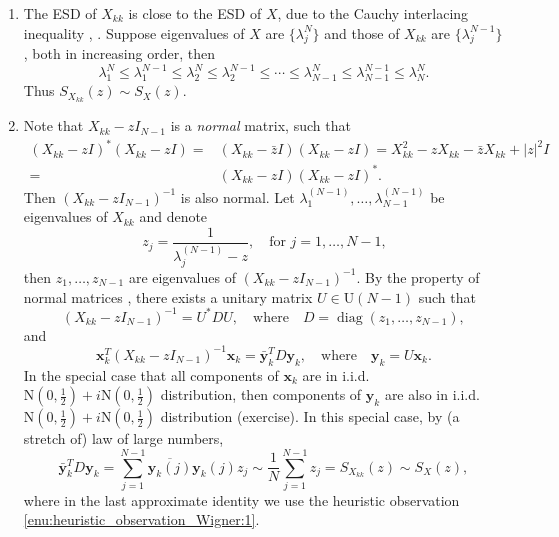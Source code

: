 \documentclass[11pt, a4paper]{article}
\numberwithin{equation}{section}
\newcommand{\iid}{i.i.d.}
\newcommand{\Unitary}{\mathrm{U}}
\newcommand{\Normal}{\mathrm{N}}
\renewcommand{\vec}[1]{\mathbf{#1}}
\DeclareMathOperator{\diag}{diag}
\theoremstyle{definition}
\theoremstyle{remark}
\begin{document}
\begin{enumerate}
\item \label{enu:heuristic_observation_Wigner:1}
  The ESD of $X_{kk}$ is close to the ESD of $X$, due to the Cauchy interlacing inequality \cite[Section 4.3]{Horn-Johnson90}, \cite[Section 1.4]{Courant-Hilbert53}. Suppose eigenvalues of $X$ are $\{ \lambda^N_j \}$ and those of $X_{kk}$ are $\{ \lambda^{N - 1}_j \}$, both in increasing order, then
  \begin{equation}
    \lambda^N_1 \leq \lambda^{N - 1}_1 \leq \lambda^N_2 \leq \lambda^{N - 1}_2 \leq \dotsb \leq \lambda^N_{N - 1} \leq \lambda^{N - 1}_{N - 1} \leq \lambda^N_N.
  \end{equation}
  Thus $S_{X_{kk}}(z) \sim S_X(z)$.
\item
  Note that $X_{kk} - zI_{N - 1}$ is a \emph{normal} matrix, such that
  \begin{equation}
    \begin{split}
      (X_{kk} - zI)^* (X_{kk} - zI) = {}& (X_{kk} - \bar{z}I) (X_{kk} - zI) = X^2_{kk} - zX_{kk} - \bar{z}X_{kk} + \lvert z \rvert^2 I \\
      = {}& (X_{kk} - zI) (X_{kk} - zI)^*.
    \end{split}
  \end{equation}
  Then $(X_{kk} - zI_{N - 1})^{-1}$ is also normal. Let $\lambda^{(N - 1)}_1, \dots, \lambda^{(N - 1)}_{N - 1}$ be eigenvalues of $X_{kk}$ and denote
  \begin{equation} \label{eq:defn_of_z_j_from_lambda_j}
    z_j = \frac{1}{\lambda^{(N - 1)}_j - z}, \quad \text{for $j = 1, \dotsc, N - 1$,}
  \end{equation}
  then $z_1, \dots, z_{N - 1}$ are eigenvalues of $(X_{kk} - zI_{N - 1})^{-1}$. By the property of normal matrices \cite[Section 2.5]{Horn-Johnson90}, there exists a unitary matrix $U \in \Unitary(N - 1)$ such that
  \begin{equation}
    (X_{kk} - zI_{N - 1})^{-1} = U^* D U, \quad \text{where} \quad D = \diag(z_1, \dotsc, z_{N - 1}),
  \end{equation}
  and
  \begin{equation}
    \vec{x}^T_k (X_{kk} - z I_{N - 1})^{-1} \vec{x}_k = \bar{\vec{y}}^T_k D \vec{y}_k, \quad \text{where} \quad \vec{y}_k = U \vec{x}_k.
  \end{equation}
  In the special case that all components of $\vec{x}_k$ are in \iid\ $\Normal(0, \frac{1}{2}) + i\Normal(0, \frac{1}{2})$ distribution, then components of $\vec{y}_k$ are also in \iid\ $\Normal(0, \frac{1}{2}) + i\Normal(0, \frac{1}{2})$ distribution (exercise). In this special case, by (a stretch of) law of large numbers,
  \begin{equation}
    \bar{\vec{y}}^T_k D \vec{y}_k = \sum^{N - 1}_{j = 1} \overline{\vec{y}_k(j)} \vec{y}_k(j) z_j \sim \frac{1}{N} \sum^{N - 1}_{j = 1} z_j = S_{X_{kk}}(z) \sim S_X(z),
  \end{equation}
  where in the last approximate identity we use the heuristic observation \ref{enu:heuristic_observation_Wigner:1}.
\end{enumerate}
\end{document}

